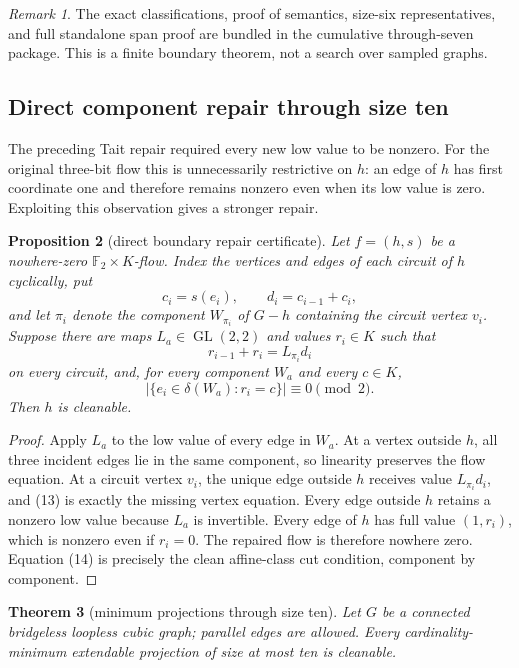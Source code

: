 \documentclass[11pt]{article}
\newtheorem{theorem}{Theorem}[section]
\newtheorem{proposition}[theorem]{Proposition}
\theoremstyle{definition}
\theoremstyle{remark}
\newtheorem{remark}[theorem]{Remark}
\newcommand{\F}{\mathbb F}
\begin{document}
\begin{remark}
The exact classifications, proof of semantics, size-six representatives,
and full standalone span proof are bundled in the cumulative through-seven
package.  This is a finite boundary theorem, not a search over sampled
graphs.
\end{remark}

\subsection{Direct component repair through size ten}

The preceding Tait repair required every new low value to be nonzero.
For the original three-bit flow this is unnecessarily restrictive on
\(h\): an edge of \(h\) has first coordinate one and therefore remains
nonzero even when its low value is zero.  Exploiting this observation
gives a stronger repair.

\begin{proposition}[direct boundary repair certificate]
\label{prop:directrepair}
Let \(f=(h,s)\) be a nowhere-zero \(\F_2\times K\)-flow.  Index the
vertices and edges of each circuit of \(h\) cyclically, put
\[
 c_i=s(e_i),\qquad d_i=c_{i-1}+c_i,
\]
and let \(\pi_i\) denote the component \(W_{\pi_i}\) of \(G-h\) containing
the circuit vertex \(v_i\).  Suppose there are maps
\(L_a\in\operatorname{GL}(2,2)\) and values \(r_i\in K\) such that
\[
                    r_{i-1}+r_i=L_{\pi_i}d_i              \tag{13}
\]
on every circuit, and, for every component \(W_a\) and every \(c\in K\),
\[
 \bigl|\{e_i\in\delta(W_a):r_i=c\}\bigr|\equiv0\pmod2.    \tag{14}
\]
Then \(h\) is cleanable.
\end{proposition}

\begin{proof}
Apply \(L_a\) to the low value of every edge in \(W_a\).  At a vertex
outside \(h\), all three incident edges lie in the same component, so
linearity preserves the flow equation.  At a circuit vertex \(v_i\), the
unique edge outside \(h\) receives value \(L_{\pi_i}d_i\), and (13) is
exactly the missing vertex equation.  Every edge outside \(h\) retains a
nonzero low value because \(L_a\) is invertible.  Every edge of \(h\) has
full value \((1,r_i)\), which is nonzero even if \(r_i=0\).  The repaired
flow is therefore nowhere zero.  Equation (14) is precisely the clean
affine-class cut condition, component by component.
\end{proof}

\begin{theorem}[minimum projections through size ten]
\label{thm:sizeten}
Let \(G\) be a connected bridgeless loopless cubic graph; parallel edges
are allowed.  Every cardinality-minimum extendable projection of size at
most ten is cleanable.
\end{theorem}
\end{document}
